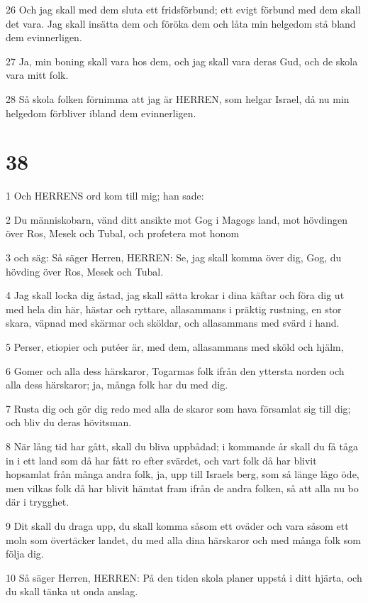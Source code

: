 \par 26 Och jag skall med dem sluta ett fridsförbund; ett evigt förbund med dem skall det vara. Jag skall insätta dem och föröka dem och låta min helgedom stå bland dem evinnerligen.
\par 27 Ja, min boning skall vara hos dem, och jag skall vara deras Gud, och de skola vara mitt folk.
\par 28 Så skola folken förnimma att jag är HERREN, som helgar Israel, då nu min helgedom förbliver ibland dem evinnerligen.

\chapter{38}

\par 1 Och HERRENS ord kom till mig; han sade:
\par 2 Du människobarn, vänd ditt ansikte mot Gog i Magogs land, mot hövdingen över Ros, Mesek och Tubal, och profetera mot honom
\par 3 och säg: Så säger Herren, HERREN: Se, jag skall komma över dig, Gog, du hövding över Ros, Mesek och Tubal.
\par 4 Jag skall locka dig åstad, jag skall sätta krokar i dina käftar och föra dig ut med hela din här, hästar och ryttare, allasammans i präktig rustning, en stor skara, väpnad med skärmar och sköldar, och allasammans med svärd i hand.
\par 5 Perser, etiopier och putéer är, med dem, allasammans med sköld och hjälm,
\par 6 Gomer och alla dess härskaror, Togarmas folk ifrån den yttersta norden och alla dess härskaror; ja, många folk har du med dig.
\par 7 Rusta dig och gör dig redo med alla de skaror som hava församlat sig till dig; och bliv du deras hövitsman.
\par 8 När lång tid har gått, skall du bliva uppbådad; i kommande år skall du få tåga in i ett land som då har fått ro efter svärdet, och vart folk då har blivit hopsamlat från många andra folk, ja, upp till Israels berg, som så länge lågo öde, men vilkas folk då har blivit hämtat fram ifrån de andra folken, så att alla nu bo där i trygghet.
\par 9 Dit skall du draga upp, du skall komma såsom ett oväder och vara såsom ett moln som övertäcker landet, du med alla dina härskaror och med många folk som följa dig.
\par 10 Så säger Herren, HERREN: På den tiden skola planer uppstå i ditt hjärta, och du skall tänka ut onda anslag.
